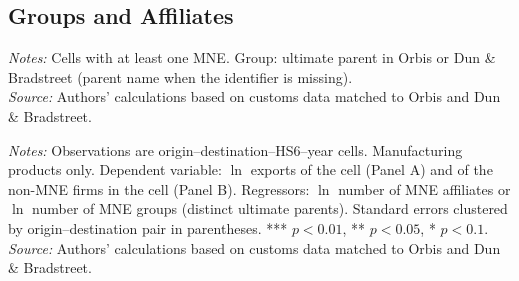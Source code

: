 \documentclass[11pt,a4paper]{article}
\begin{document}
\subsection{Groups and Affiliates}
\begin{table}[H]\centering\small%
  \caption{Manufacturing: Multinational Affiliates and Groups in Origin--Destination--Product--Year Cells}%
  \label{tab:grp_manufacturing}%
  \par\vspace{3pt}%
  \begin{minipage}{0.95\textwidth}\footnotesize %
  \textit{Notes:} Cells with at least one MNE. Group: ultimate parent in Orbis or Dun \& Bradstreet (parent name when the identifier is missing).\\[3pt]%
  \textit{Source:} Authors' calculations based on customs data matched to Orbis and Dun \& Bradstreet.%
  \end{minipage}%
  \end{table}
\begin{table}[H]\centering\small%
  \caption{Manufacturing: Multinational Presence and Exports: Affiliates and Groups}%
  \label{tab:grp_r_manufacturing}%
  \par\vspace{3pt}%
  \begin{minipage}{0.95\textwidth}\footnotesize %
  \textit{Notes:} Observations are origin--destination--HS6--year cells. Manufacturing products only. Dependent variable: $\ln$ exports of the cell (Panel A) and of the non-MNE firms in the cell (Panel B). Regressors: $\ln$ number of MNE affiliates or $\ln$ number of MNE groups (distinct ultimate parents). Standard errors clustered by origin--destination pair in parentheses. *** $p<0.01$, ** $p<0.05$, * $p<0.1$.\\[3pt]%
  \textit{Source:} Authors' calculations based on customs data matched to Orbis and Dun \& Bradstreet.%
  \end{minipage}%
  \end{table}
\end{document}

